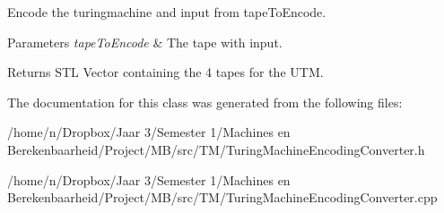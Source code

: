\-Encode the turingmachine and input from {\ttfamily tape\-To\-Encode}. 


\begin{DoxyParams}{\-Parameters}
{\em tape\-To\-Encode} & \-The tape with input. \\
\hline
\end{DoxyParams}
\begin{DoxyReturn}{\-Returns}
\-S\-T\-L \-Vector containing the 4 tapes for the \-U\-T\-M. 
\end{DoxyReturn}


\-The documentation for this class was generated from the following files\-:\begin{DoxyCompactItemize}
\item 
/home/n/\-Dropbox/\-Jaar 3/\-Semester 1/\-Machines en Berekenbaarheid/\-Project/\-M\-B/src/\-T\-M/\-Turing\-Machine\-Encoding\-Converter.\-h\item 
/home/n/\-Dropbox/\-Jaar 3/\-Semester 1/\-Machines en Berekenbaarheid/\-Project/\-M\-B/src/\-T\-M/\-Turing\-Machine\-Encoding\-Converter.\-cpp\end{DoxyCompactItemize}
